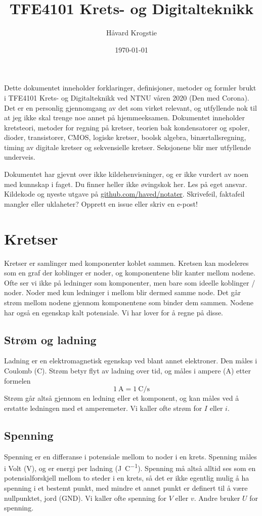 \documentclass[12pt,a4paper,norsk]{article}
\title{TFE4101 Krets- og Digitalteknikk}
\author{Håvard Krogstie\\\randomize{\lst{}.\fst{}@gmail.com}}
\date{\today}
\begin{document}
\maketitle

\noindent
Dette dokumentet inneholder forklaringer, definisjoner, metoder og formler brukt
i TFE4101 Krets- og Digitalteknikk ved NTNU våren 2020 (Den med Corona). Det er
en personlig gjennomgang av det som virket relevant, og utfyllende nok til at jeg
ikke skal trenge noe annet på hjemmeeksamen. Dokumentet inneholder kretsteori,
metoder for regning på kretser, teorien bak kondensatorer og spoler, dioder,
transistorer, CMOS, logiske kretser, boolsk algebra, binærtallsregning, timing
av digitale kretser og sekvensielle kretser. Seksjonene blir mer utfyllende
underveis.

Dokumentet har gjevnt over ikke kildehenvisninger, og er ikke vurdert av noen
med kunnskap i faget. Du finner heller ikke øvingskok her. Les på eget ansvar.
Kildekode og nyeste utgave på
\href{https://github.com/haved/notater/}{github.com/haved/notater}. Skrivefeil,
faktafeil mangler eller uklaheter? Opprett en issue eller skriv en e-post!

\tableofcontents
\clearpage

\section{Kretser}
Kretser er samlinger med komponenter koblet sammen. Kretsen kan modeleres som en
graf der koblinger er noder, og komponentene blir kanter mellom
nodene. Ofte ser vi ikke på ledninger som komponenter, men bare som
ideelle koblinger / noder. Noder med kun ledninger i mellom blir dermed samme
node. Det går strøm mellom nodene gjennom komponentene som binder dem sammen.
Nodene har også en egenskap kalt potensiale. Vi har lover for å regne på disse.

\subsection{Strøm og ladning}
Ladning er en elektromagnetisk egenskap ved blant annet elektroner. Den måles i
Coulomb (\si{\coulomb}). Strøm betyr flyt av ladning over tid, og måles i ampere
(\si{\ampere}) etter formelen
\[\SI{1}{\ampere} = \SI{1}{\coulomb\per\second}\]
Strøm går altså gjennom en ledning eller et komponent, og kan måles ved å
erstatte ledningen med et amperemeter. Vi kaller ofte strøm for $I$ eller $i$.

\subsection{Spenning}
Spenning er en differanse i potensiale mellom to noder i en krets. Spenning
måles i Volt (\si{\volt}), og er energi per ladning (\si{\joule\per\coulomb}).
Spenning må altså alltid ses som en potensialforskjell mellom to steder i en
krets, så det er ikke egentlig mulig å ha spenning i et bestemt punkt, med
mindre et annet punkt er definert til å være nullpunktet, jord (GND). Vi kaller
ofte spenning for $V$ eller $v$. Andre bruker $U$ for spenning.
\end{document}
